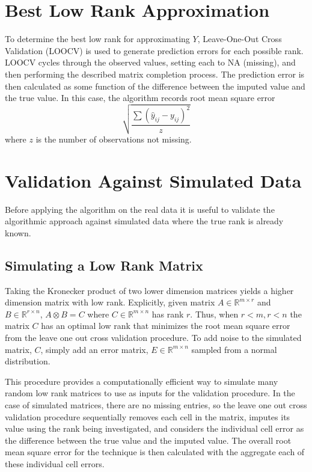 \documentclass[12pt,twoside]{dukestatscithesis}
\theoremstyle{definition}
\theoremstyle{definition}
\theoremstyle{definition}
\theoremstyle{remark}
\begin{document}
\section{Best Low Rank Approximation}\label{best-low-rank-approximation}

To determine the best low rank for approximating \(Y\), Leave-One-Out
Cross Validation (LOOCV) is used to generate prediction errors for each
possible rank. LOOCV cycles through the observed values, setting each to
NA (missing), and then performing the described matrix completion
process. The prediction error is then calculated as some function of the
difference between the imputed value and the true value. In this case,
the algorithm records root mean square error
\[\sqrt{\frac{\sum (\hat y_{ij} - y_{ij})^2}{z}}\] where \(z\) is the
number of observations not missing.

\section{Validation Against Simulated
Data}\label{validation-against-simulated-data}

Before applying the algorithm on the real data it is useful to validate
the algorithmic approach against simulated data where the true rank is
already known.

\subsection{Simulating a Low Rank
Matrix}\label{simulating-a-low-rank-matrix}

Taking the Kronecker product of two lower dimension matrices yields a
higher dimension matrix with low rank. Explicitly, given matrix
\(A \in \mathbb{R}^{m \times r}\) and \(B \in \mathbb{R}^{r \times n}\),
\(A \otimes B = C\) where \(C \in \mathbb{R}^{m \times n}\) has rank
\(r\). Thus, when \(r < m, r < n\) the matrix \(C\) has an optimal low
rank that minimizes the root mean square error from the leave one out
cross validation procedure. To add noise to the simulated matrix, \(C\),
simply add an error matrix, \(E \in \mathbb{R}^{m \times n}\) sampled
from a normal distribution.

This procedure provides a computationally efficient way to simulate many
random low rank matrices to use as inputs for the validation procedure.
In the case of simulated matrices, there are no missing entries, so the
leave one out cross validation procedure sequentially removes each cell
in the matrix, imputes its value using the rank being investigated, and
considers the individual cell error as the difference between the true
value and the imputed value. The overall root mean square error for the
technique is then calculated with the aggregate each of these individual
cell errors.
\end{document}
